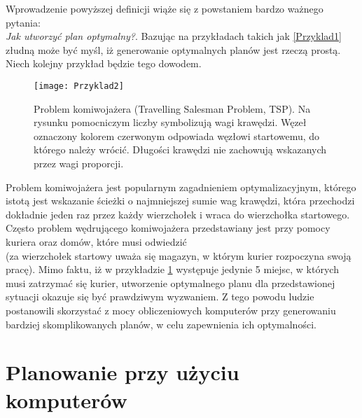     Wprowadzenie powyższej definicji wiąże się z powstaniem bardzo ważnego pytania: \\
    \textit{Jak utworzyć plan optymalny?}. Bazując na przykładach
    takich jak \ref{Przyklad1} złudną może być myśl, iż generowanie optymalnych planów jest rzeczą prostą. Niech kolejny przykład będzie tego
    dowodem.
    \begin{figure}[H]
        \texttt{[image: Przyklad2]}
        \centering
        \caption{Problem komiwojażera (Travelling Salesman Problem, TSP). Na rysunku pomocniczym liczby symbolizują wagi krawędzi. Węzeł oznaczony
        kolorem czerwonym odpowiada węzłowi startowemu, do którego należy wrócić. Długości krawędzi nie zachowują wskazanych przez wagi proporcji.}
        \label{TSP}
    \end{figure}
    Problem komiwojażera jest popularnym zagadnieniem optymalizacyjnym, którego istotą jest wskazanie ścieżki o najmniejszej sumie wag krawędzi, 
    która przechodzi dokładnie jeden raz przez każdy wierzchołek i wraca do wierzchołka startowego. Często problem wędrującego 
    komiwojażera przedstawiany jest przy pomocy kuriera oraz domów, które musi odwiedzić\\
    (za wierzchołek startowy uważa się magazyn,
    w którym kurier rozpoczyna swoją pracę). Mimo faktu, iż w przykładzie \ref{TSP} występuje jedynie 5 miejsc, 
    w których musi zatrzymać się kurier, utworzenie optymalnego planu dla przedstawionej sytuacji okazuje się być prawdziwym wyzwaniem. Z tego powodu 
    ludzie postanowili skorzystać z mocy obliczeniowych komputerów przy generowaniu bardziej skomplikowanych planów, w celu zapewnienia ich 
    optymalności.


\section{Planowanie przy użyciu komputerów}

